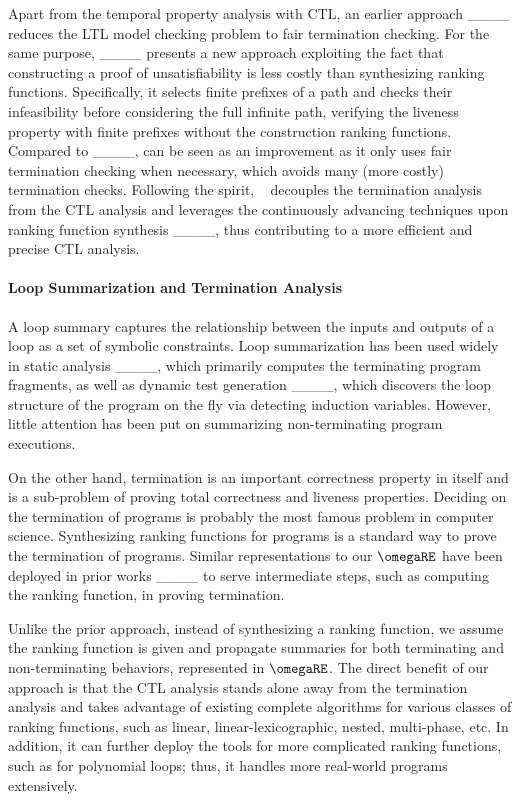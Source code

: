 Apart from the temporal property analysis with CTL, an earlier approach  ____ reduces the LTL model checking problem to fair termination checking. For the same purpose, \ultimate ____ presents a new approach exploiting the fact that constructing a proof of unsatisfiability is less costly than synthesizing ranking functions. 
Specifically, it selects finite prefixes of a path and checks their infeasibility before considering the full infinite path, verifying the liveness property with finite prefixes without the construction ranking functions. 
Compared to ____, \ultimateshort can be seen as an improvement as it only uses fair termination checking when necessary, which avoids many (more costly) termination checks. 
Following the spirit, \toolName~ decouples the termination analysis from the CTL analysis and leverages the continuously advancing techniques upon ranking function synthesis  ____, thus contributing to a more efficient and precise CTL analysis. 


\vspace{-1mm}
\noindent\paragraph{\textbf{Loop Summarization and Termination Analysis}}
A loop summary captures the relationship between the inputs and outputs of a loop as a set of symbolic constraints.
Loop summarization has been used widely in static analysis ____, which primarily computes the terminating program fragments, as well as dynamic test generation ____, which discovers the loop structure of the program on the fly via detecting induction variables. However, little attention has been put on summarizing non-terminating program executions. 

On the other hand, termination is an important correctness property in itself and is a sub-problem of proving total correctness and liveness properties. Deciding on the termination of programs is probably the most famous problem in computer science. Synthesizing ranking functions for programs is a standard way to prove the termination of programs. 
Similar representations to our $\omegaRE$ have been deployed in prior works ____ to serve intermediate steps, such as computing the ranking function, in proving termination. 



Unlike the prior approach, instead of synthesizing a ranking function, we assume the ranking function is given and propagate summaries for both terminating and non-terminating behaviors, represented in $\omegaRE$.  
The direct benefit of our approach is that the CTL analysis stands alone away from the termination analysis and takes advantage of existing complete algorithms for various classes of ranking functions, such as linear, linear-lexicographic, nested, multi-phase, etc. 
In addition, it can further deploy the tools for more complicated ranking functions, such as for polynomial loops; thus, it handles more real-world programs extensively. 



